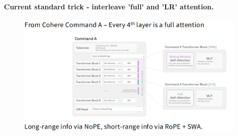 \clearpage
\paragraph{Current standard trick - interleave 'full' and 'LR' attention.}
\begin{figure}[htbp]
  \centering
  \includegraphics[width=1\linewidth]{figs/lec3/lec3.38.png}
\end{figure}







